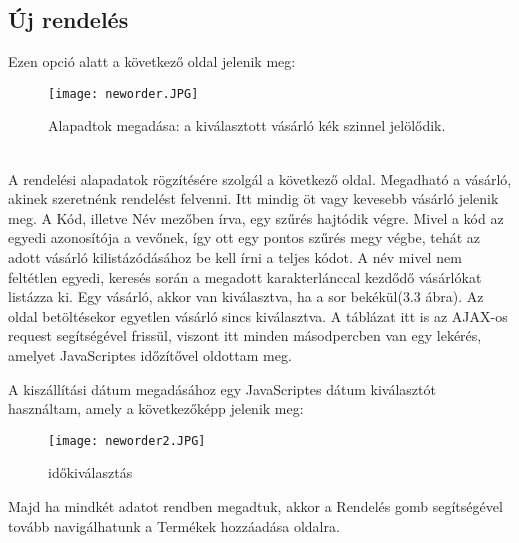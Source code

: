 \subsection{Új rendelés}
Ezen opció alatt a következő oldal jelenik meg:
\begin{figure}[h]
    \centering
    \texttt{[image: neworder.JPG]}
    \caption{Alapadtok megadása: a kiválasztott vásárló kék szinnel jelölődik.}
\end{figure}
\\
A rendelési alapadatok rögzítésére szolgál a következő oldal. Megadható a vásárló, akinek szeretnénk rendelést felvenni. Itt mindig öt vagy kevesebb vásárló jelenik meg. A Kód, illetve Név mezőben írva, egy szűrés hajtódik végre. Mivel a kód az egyedi azonosítója a vevőnek, így ott egy pontos szűrés megy végbe, tehát az adott vásárló kilistázódásához be kell írni a teljes kódot. A név mivel nem feltétlen egyedi, keresés során a megadott karakterlánccal kezdődő vásárlókat listázza ki. Egy vásárló, akkor van kiválasztva, ha a sor bekékül(3.3 ábra). Az oldal betöltésekor egyetlen vásárló sincs kiválasztva. A táblázat itt is az AJAX-os request segítségével frissül, viszont itt minden másodpercben van egy lekérés, amelyet JavaScriptes időzítővel oldottam meg.

A kiszállítási dátum megadásához egy JavaScriptes dátum kiválasztót használtam, amely a következőképp jelenik meg: 
\begin{figure}[h]
    \centering
    \texttt{[image: neworder2.JPG]}
    \caption{időkiválasztás}
\end{figure}
\newpage
Majd ha mindkét adatot rendben megadtuk, akkor a Rendelés gomb segítségével tovább navigálhatunk a Termékek hozzáadása oldalra.
